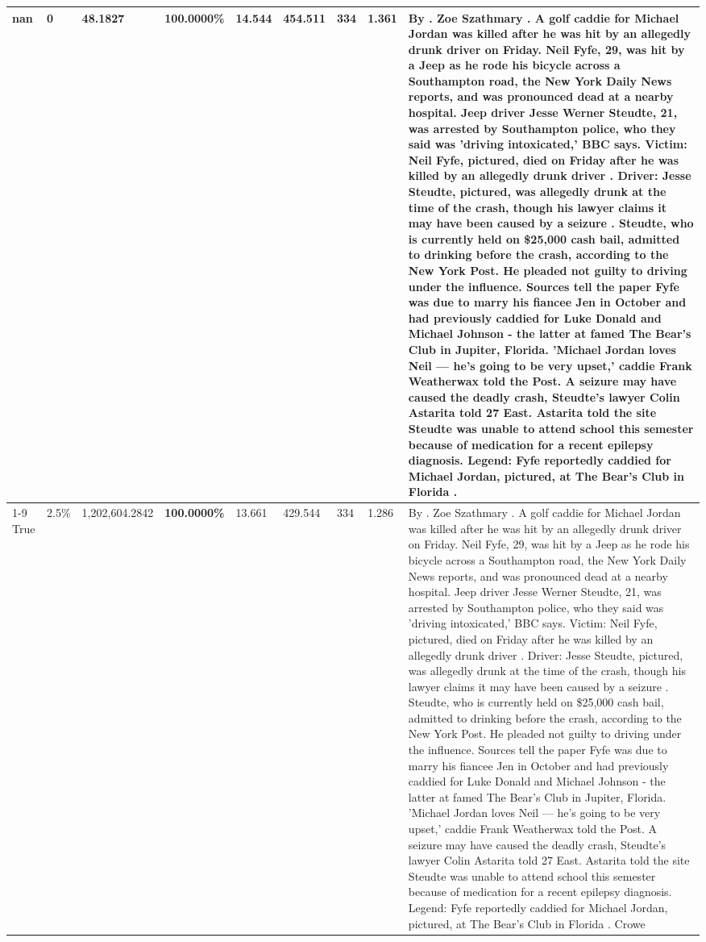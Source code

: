 \begin{table}[H]
\begin{tabular}{lllrlllll}
nan & 0 & \bfseries 48.1827 & \bfseries 100.0000\% & 14.544 & 454.511 & 334 & 1.361 & By . Zoe Szathmary . A golf caddie for Michael Jordan was killed after he was hit by an allegedly drunk driver on Friday. Neil Fyfe, 29, was hit by a Jeep as he rode his bicycle across a Southampton road, the New York Daily News reports, and was pronounced dead at a nearby hospital. Jeep driver Jesse Werner Steudte, 21, was arrested by Southampton police, who they said was 'driving intoxicated,' BBC says. Victim: Neil Fyfe, pictured, died on Friday after he was killed by an allegedly drunk driver . Driver: Jesse Steudte, pictured, was allegedly drunk at the time of the crash, though his lawyer claims it may have been caused by a seizure . Steudte, who is currently held on \$25,000 cash bail, admitted to drinking before the crash, according to the New York Post. He pleaded not guilty to driving under the influence. Sources tell the paper Fyfe was due to marry his fiancee Jen in October and had previously caddied for Luke Donald and Michael Johnson - the latter at famed The Bear's Club in Jupiter, Florida. 'Michael Jordan loves Neil — he’s going to be very upset,' caddie Frank Weatherwax told the Post. A seizure may have caused the deadly crash, Steudte's lawyer Colin Astarita told 27 East. Astarita told the site Steudte was unable to attend school this semester because of medication for a recent epilepsy diagnosis. Legend: Fyfe reportedly caddied for Michael Jordan, pictured, at The Bear's Club in Florida .
 \\
\cline{1-9}
True & 2.5\% & 1,202,604.2842 & \bfseries \color{red} 100.0000\% & 13.661 & 429.544 & 334 & 1.286 & By . Zoe Szathmary . A golf caddie for Michael Jordan was killed after he was hit by an allegedly drunk driver on Friday. Neil Fyfe, 29, was hit by a Jeep as he rode his bicycle across a Southampton road, the New York Daily News reports, and was pronounced dead at a nearby hospital. Jeep driver Jesse Werner Steudte, 21, was arrested by Southampton police, who they said was 'driving intoxicated,' BBC says. Victim: Neil Fyfe, pictured, died on Friday after he was killed by an allegedly drunk driver . Driver: Jesse Steudte, pictured, was allegedly drunk at the time of the crash, though his lawyer claims it may have been caused by a seizure . Steudte, who is currently held on \$25,000 cash bail, admitted to drinking before the crash, according to the New York Post. He pleaded not guilty to driving under the influence. Sources tell the paper Fyfe was due to marry his fiancee Jen in October and had previously caddied for Luke Donald and Michael Johnson - the latter at famed The Bear's Club in Jupiter, Florida. 'Michael Jordan loves Neil — he’s going to be very upset,' caddie Frank Weatherwax told the Post. A seizure may have caused the deadly crash, Steudte's lawyer Colin Astarita told 27 East. Astarita told the site Steudte was unable to attend school this semester because of medication for a recent epilepsy diagnosis. Legend: Fyfe reportedly caddied for Michael Jordan, pictured, at The Bear's Club in Florida . Crowe \\

\end{tabular}
\end{table}
